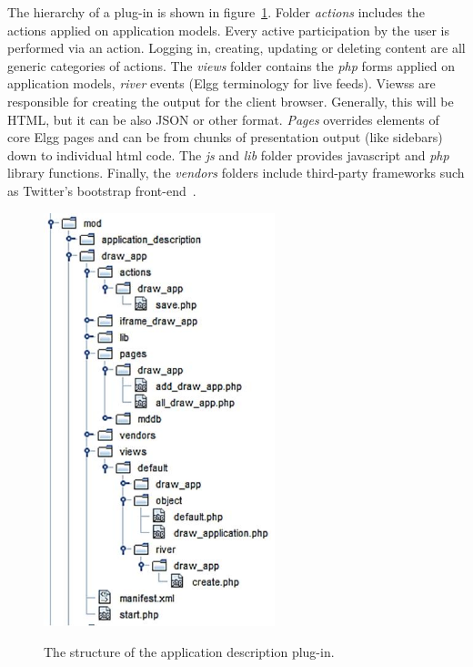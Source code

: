 The hierarchy of a plug-in is shown in figure~\ref{fig:elgg_hierarchy}. 
Folder {\em actions} includes the actions applied on application models. Every active participation by the user is performed via an action. Logging in, creating, updating or deleting content are all generic categories of actions.
The {\em views} folder contains the {\em php} forms applied on application models, {\em river} events (Elgg terminology for live feeds). Viewss are responsible for creating the output for the client browser. Generally, this will be HTML, but it can be also JSON or other format. 
{\em Pages} overrides elements of core Elgg pages and can be from chunks of presentation output (like sidebars) down to individual html code.  
The {\em js} and {\em lib} folder provides javascript and {\em php} library functions. 
Finally, the {\em vendors} folders include third-party frameworks such as Twitter's bootstrap front-end~\cite{bootstrap_url}.


\begin{figure}[h]
	\caption{The structure of the application description plug-in.}
	\includegraphics[width=0.6\textwidth,natwidth=200,natheight=150]{./fig/folder_hierarchy.jpg}
	\centering
	\label{fig:elgg_hierarchy}
\end{figure}

